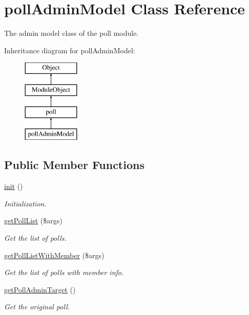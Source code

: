 \hypertarget{classpollAdminModel}{}\section{poll\+Admin\+Model Class Reference}
\label{classpollAdminModel}


The admin model class of the poll module.  


Inheritance diagram for poll\+Admin\+Model\+:\begin{figure}[H]
\begin{center}
\leavevmode
\includegraphics[height=4.000000cm]{classpollAdminModel}
\end{center}
\end{figure}
\subsection*{Public Member Functions}
\begin{DoxyCompactItemize}
\item 
\hyperlink{classpollAdminModel_ab414abeed028a478983ac6f493340e87}{init} ()
\begin{DoxyCompactList}\small\item\em Initialization. \end{DoxyCompactList}\item 
\hyperlink{classpollAdminModel_a96ab22244c98bf1b777265f0027aca6e}{get\+Poll\+List} (\$args)
\begin{DoxyCompactList}\small\item\em Get the list of polls. \end{DoxyCompactList}\item 
\hyperlink{classpollAdminModel_a5fcc86af506f4a18e0f5c3c0bde0c0e6}{get\+Poll\+List\+With\+Member} (\$args)
\begin{DoxyCompactList}\small\item\em Get the list of polls with member info. \end{DoxyCompactList}\item 
\hyperlink{classpollAdminModel_ab66a2c6d66e9bebfabf443255c78e401}{get\+Poll\+Admin\+Target} ()
\begin{DoxyCompactList}\small\item\em Get the original poll. \end{DoxyCompactList}\end{DoxyCompactItemize}
